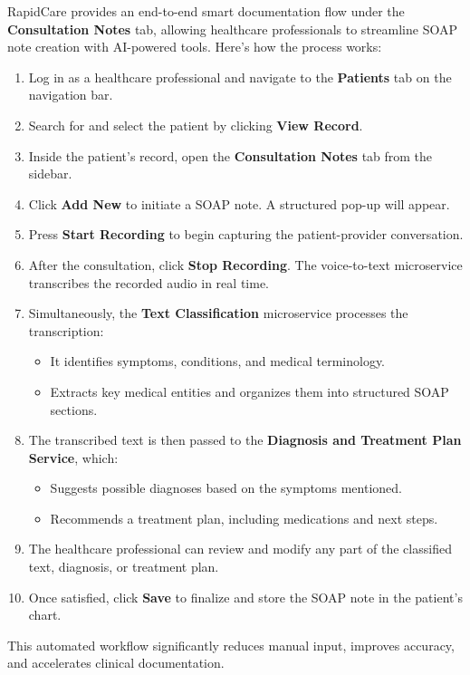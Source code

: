 \documentclass[12pt, titlepage]{article}
\begin{document}
RapidCare provides an end-to-end smart documentation flow under the \textbf{Consultation Notes} tab, allowing healthcare professionals to streamline SOAP note creation with AI-powered tools. Here's how the process works:

\begin{enumerate}
    \item Log in as a healthcare professional and navigate to the \textbf{Patients} tab on the navigation bar.
    \item Search for and select the patient by clicking \textbf{View Record}.
    \item Inside the patient's record, open the \textbf{Consultation Notes} tab from the sidebar.
    \item Click \textbf{Add New} to initiate a SOAP note. A structured pop-up will appear.
    \item Press \textbf{Start Recording} to begin capturing the patient-provider conversation.
    \item After the consultation, click \textbf{Stop Recording}. The voice-to-text microservice transcribes the recorded audio in real time.
    \item Simultaneously, the \textbf{Text Classification} microservice processes the transcription:
    \begin{itemize}
        \item It identifies symptoms, conditions, and medical terminology.
        \item Extracts key medical entities and organizes them into structured SOAP sections.
    \end{itemize}
    \item The transcribed text is then passed to the \textbf{Diagnosis and Treatment Plan Service}, which:
    \begin{itemize}
        \item Suggests possible diagnoses based on the symptoms mentioned.
        \item Recommends a treatment plan, including medications and next steps.
    \end{itemize}
    \item The healthcare professional can review and modify any part of the classified text, diagnosis, or treatment plan.
    \item Once satisfied, click \textbf{Save} to finalize and store the SOAP note in the patient's chart.
\end{enumerate}

This automated workflow significantly reduces manual input, improves accuracy, and accelerates clinical documentation.
\end{document}

